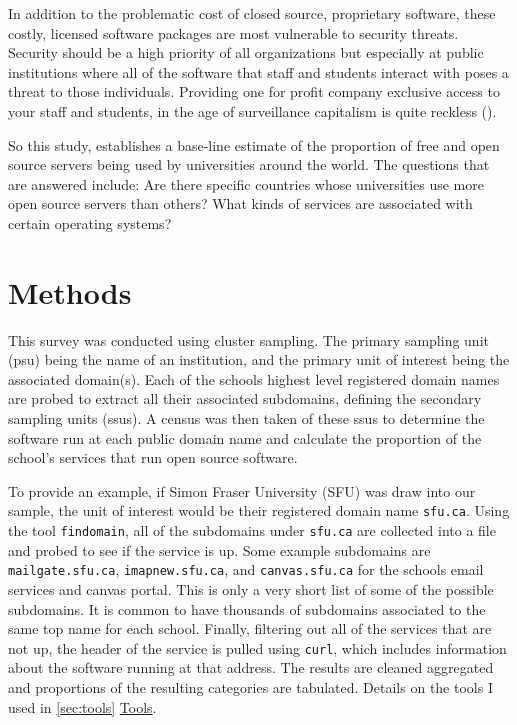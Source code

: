 \documentclass{article}
\theoremstyle{definition}
\begin{document}
\begin{flushleft}
\begin{multicols}{2}
In addition to the problematic cost of closed source, proprietary
software, these costly, licensed software packages are most vulnerable
to security threats.
Security should be a high priority of all organizations but
especially at public institutions where all of the software that staff and
students interact with poses a threat to those individuals.
Providing one for profit company exclusive access to your staff and
students, in the age of surveillance capitalism is quite reckless
(\cite{karen2018}).

So this study, establishes a base-line estimate
of the proportion of free and open source servers being used by
universities around the world.
The questions that are answered include:
Are there specific countries whose universities
use more open source servers than others? What kinds of services
are associated with certain operating systems?

\section{Methods}
This survey was conducted using cluster sampling.
The primary sampling unit (psu) being the name
of an institution, and the primary unit of interest
being the associated domain(s). Each of the schools
highest level registered domain names are probed to
extract all their associated subdomains, defining the secondary
sampling units (ssus).
A census was then taken of these ssus
to determine the software run at each public domain name and
calculate the proportion of the school's services that
run open source software.

To provide an example, if Simon Fraser University (SFU)
was draw into our sample, the unit of interest would be
their registered domain name \texttt{sfu.ca}. Using the
tool \texttt{findomain}, all of the subdomains under
\texttt{sfu.ca} are collected into a file and probed to see if the service is up.
Some example subdomains are \texttt{mailgate.sfu.ca},
\texttt{imapnew.sfu.ca}, and \texttt{canvas.sfu.ca} for
the schools email services and canvas portal. This is
only a very short list of some of the possible subdomains.
It is common to have thousands of subdomains associated
to the same top name for each school. Finally, filtering out all of
the services that are not up, the header of the service is pulled
using \texttt{curl}, which includes information about the software
running at that address. The results are cleaned aggregated and proportions
of the resulting categories are tabulated.
Details on the tools I used in \autoref{sec:tools} \hyperref[sec:tools]{Tools}.


\end{multicols}
\end{flushleft}
\end{document}
